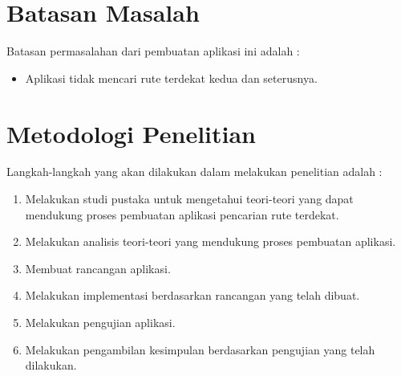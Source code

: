 \section{Batasan Masalah}
Batasan permasalahan dari pembuatan aplikasi ini adalah :
\begin{itemize}
	\item Aplikasi tidak mencari rute terdekat kedua dan seterusnya.
\end{itemize}

\section{Metodologi Penelitian}
Langkah-langkah yang akan dilakukan dalam melakukan penelitian adalah :
\begin{enumerate}
	\item Melakukan studi pustaka untuk mengetahui teori-teori yang dapat mendukung
	proses pembuatan aplikasi pencarian rute terdekat.
	\item Melakukan analisis teori-teori yang mendukung proses pembuatan aplikasi.
	\item Membuat rancangan aplikasi.
	\item Melakukan implementasi berdasarkan rancangan yang telah dibuat.
	\item Melakukan pengujian aplikasi.
	\item Melakukan pengambilan kesimpulan berdasarkan pengujian yang telah dilakukan.
\end{enumerate}

